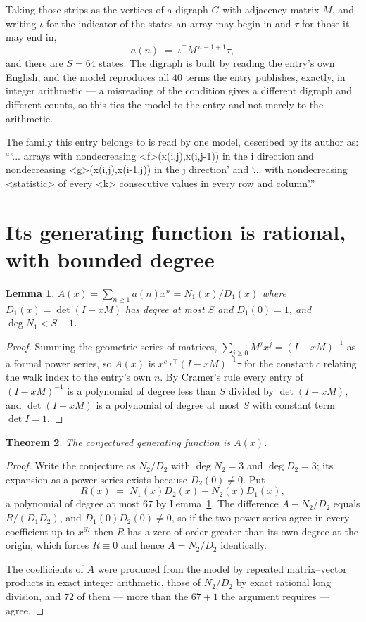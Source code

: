 \documentclass[11pt,a4paper]{article}
\theoremstyle{plain}
\newtheorem{theorem}{Theorem}
\newtheorem{lemma}[theorem]{Lemma}
\theoremstyle{definition}
\begin{document}
Taking those strips as the vertices of a digraph $G$ with adjacency matrix $M$, and writing
$\iota$ for the indicator of the states an array may begin in and $\tau$ for those it may end
in,
\[
a(n)\;=\;\iota^{\!\top}M^{\,n-1+1}\tau ,
\]
and there are $S=64$ states. The digraph is built by reading the entry's own English, and the
model reproduces all $40$ terms the entry publishes, exactly, in integer arithmetic --- a
misreading of the condition gives a different digraph and different counts, so this ties the
model to the entry and not merely to the arithmetic.

The family this entry belongs to is read by one model, described by its author as: ```... arrays with nondecreasing <f>(x(i,j),x(i,j-1)) in the i direction and nondecreasing <g>(x(i,j),x(i-1,j)) in the j direction' and `... with nondecreasing <statistic> of every <k> consecutive values in every row and column'.''


\section{Its generating function is rational, with bounded degree}

\begin{lemma}\label{lem:rat}
$A(x)=\sum_{n\ge1}a(n)x^n=N_1(x)/D_1(x)$ where $D_1(x)=\det(I-xM)$ has degree at most
$S$ and $D_1(0)=1$, and $\deg N_1<S+1$.
\end{lemma}

\begin{proof}
Summing the geometric series of matrices, $\sum_{j\ge0}M^jx^j=(I-xM)^{-1}$ as a formal
power series, so $A(x)$ is $x^{c}\,\iota^{\!\top}(I-xM)^{-1}\tau$ for the constant $c$
relating the walk index to the entry's own $n$. By Cramer's rule every entry of
$(I-xM)^{-1}$ is a polynomial of degree less than $S$ divided by $\det(I-xM)$, and
$\det(I-xM)$ is a polynomial of degree at most $S$ with constant term $\det I=1$.
\end{proof}

\begin{theorem}
The conjectured generating function is $A(x)$.
\end{theorem}

\begin{proof}
Write the conjecture as $N_2/D_2$ with $\deg N_2=3$ and $\deg D_2=3$; its expansion as a
power series exists because $D_2(0)\neq0$. Put
\[
R(x)\;=\;N_1(x)D_2(x)-N_2(x)D_1(x),
\]
a polynomial of degree at most $67$ by Lemma~\ref{lem:rat}. The difference
$A-N_2/D_2$ equals $R/(D_1D_2)$, and $D_1(0)D_2(0)\neq0$, so if the two power series agree in
every coefficient up to $x^{67}$ then $R$ has a zero of order greater than its own
degree at the origin, which forces $R\equiv0$ and hence $A=N_2/D_2$ identically.

The coefficients of $A$ were produced from the model by repeated matrix--vector products in
exact integer arithmetic, those of $N_2/D_2$ by exact rational long division, and $72$
of them --- more than the $67+1$ the argument requires --- agree.
\end{proof}
\end{document}
